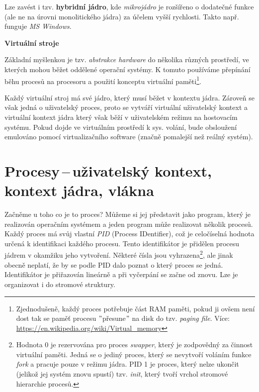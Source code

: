 \vspace{0,5cm}
Lze zavést i tzv. \textbf{hybridní jádro}, kde \textit{mikrojádro} je rozšířeno o dodatečné funkce (ale ne na úrovni monolitického jádra) za účelem vyšší rychlosti. Takto např. funguje \textit{MS Windows}.

\begin{Large}
    \vspace{0,5cm} 
    \textbf{Virtuální stroje}\\
\end{Large}

Základní myšlenkou je tzv. \textit{abstrakce hardware} do několika různých prostředí, ve kterých mohou běžet oddělené operační systémy. K tomuto používáme přepínání běhu procesů na procesoru a použití konceptu virtuální paměti\footnote{Zjednodušeně, každý proces potřebuje část RAM paměti, pokud ji ovšem není dost tak se paměť procesu $"$přesune$"$ na disk do tzv. \textit{paging file}. Více: \url{https://en.wikipedia.org/wiki/Virtual_memory}}.

\vspace{0,5cm}
Každý virtuální stroj má své jádro, který musí běžet v kontextu jádra. Zároveň se však jedná o uživatelský proces, proto se vytváří virtuální uživatelský kontext a virtuální kontext jádra který však běží v uživatelském režimu na hostovacím systému. Pokud dojde ve virtuálním prostředí k sys. volání, bude obsloužení emulováno pomocí virtualizačního software (značně pomalejší než reálný systém). 


\newpage
\section{Procesy\,--\,uživatelský kontext, kontext jádra, vlákna} \label{procesy}

Začněme u toho co je to proces? Můžeme si jej představit jako program, který je realizován operačním systémem a jeden program může realizovat několik procesů. Každý proces má svůj vlastní \textit{PID} (Process IDentifier), což je celočíselná hodnota určená k identifikaci každého procesu. Tento identifikátor je přidělen procesu jádrem v okamžiku jeho vytvoření. Některé čísla jsou vyhrazena\footnote{Hodnota 0 je rezervována pro proces \textit{swapper}, který je zodpovědný za činnost virtuální paměti. Jedná se o jediný proces, který se nevytvoří voláním funkce \textit{fork} a pracuje pouze v režimu jádra. PID 1 je proces, který nelze ukončit (jelikož jej systém znovu spustí) tzv. \textit{init}, který tvoří vrchol stromové hierarchie procesů.}, ale jinak obecně neplatí, že by se podle PID dalo poznat o který proces se jedná. Identifikátor je přiřazován lineárně a při vyčerpání se začne od znovu. Lze je organizovat i do stromové struktury.

